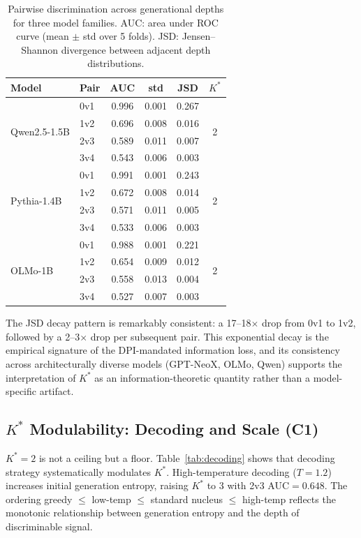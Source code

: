 \documentclass[11pt,a4paper]{article}
\begin{document}
\begin{table}[t]
\centering
\small
\caption{Pairwise discrimination across generational depths for three model families. AUC: area under ROC curve (mean $\pm$ std over 5 folds). JSD: Jensen--Shannon divergence between adjacent depth distributions.}
\label{tab:pairwise}
\begin{tabular}{@{}llcccc@{}}
\toprule
\textbf{Model} & \textbf{Pair} & \textbf{AUC} & \textbf{std} & \textbf{JSD} & \textbf{$K^*$} \\
\midrule
\multirow{4}{*}{Qwen2.5-1.5B} & 0v1 & 0.996 & 0.001 & 0.267 & \multirow{4}{*}{2} \\
 & 1v2 & 0.696 & 0.008 & 0.016 & \\
 & 2v3 & 0.589 & 0.011 & 0.007 & \\
 & 3v4 & 0.543 & 0.006 & 0.003 & \\
\midrule
\multirow{4}{*}{Pythia-1.4B} & 0v1 & 0.991 & 0.001 & 0.243 & \multirow{4}{*}{2} \\
 & 1v2 & 0.672 & 0.008 & 0.014 & \\
 & 2v3 & 0.571 & 0.011 & 0.005 & \\
 & 3v4 & 0.533 & 0.006 & 0.003 & \\
\midrule
\multirow{4}{*}{OLMo-1B} & 0v1 & 0.988 & 0.001 & 0.221 & \multirow{4}{*}{2} \\
 & 1v2 & 0.654 & 0.009 & 0.012 & \\
 & 2v3 & 0.558 & 0.013 & 0.004 & \\
 & 3v4 & 0.527 & 0.007 & 0.003 & \\
\bottomrule
\end{tabular}
\end{table}

The JSD decay pattern is remarkably consistent: a 17--18$\times$ drop from 0v1 to 1v2, followed by a 2--3$\times$ drop per subsequent pair. This exponential decay is the empirical signature of the DPI-mandated information loss, and its consistency across architecturally diverse models (GPT-NeoX, OLMo, Qwen) supports the interpretation of $K^*$ as an information-theoretic quantity rather than a model-specific artifact.

\subsection{$K^*$ Modulability: Decoding and Scale (C1)}
\label{sec:modulability}

$K^*{=}2$ is not a ceiling but a floor. Table~\ref{tab:decoding} shows that decoding strategy systematically modulates $K^*$. High-temperature decoding ($T{=}1.2$) increases initial generation entropy, raising $K^*$ to 3 with 2v3 AUC${=}0.648$. The ordering greedy $\leq$ low-temp $\leq$ standard nucleus $\leq$ high-temp reflects the monotonic relationship between generation entropy and the depth of discriminable signal.
\end{document}
